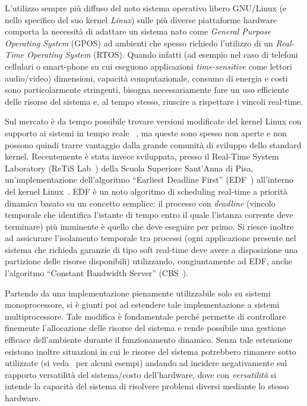 \documentclass[a4paper, 11pt, oneside]{article}
\begin{document}
L'utilizzo sempre più diffuso del noto sistema operativo libero GNU/Linux (e
nello specifico del suo kernel \emph{Linux}) sulle più diverse piattaforme
hardware comporta la necessità di adattare un sistema nato come \emph{General
Purpose Operating System} (GPOS) ad ambienti che spesso richiedo l'utilizzo
di un \emph{Real-Time Operating System} (RTOS). Quando infatti (ad esempio
nel caso di telefoni cellulari o smart-phone su cui eseguono applicazioni
\emph{time-sensitive} come lettori audio/video) dimensioni,
capacità computazionale, consumo di energia e costi sono particolarmente
stringenti, bisogna necessariamente fare un uso efficiente delle risorse del
sistema e, al tempo stesso, riuscire a rispettare i vincoli real-time.

Sul mercato è da tempo possibile trovare versioni modificate del kernel Linux
con supporto ai sistemi in tempo reale~\cite{windriver, timesys, montavista}
, ma queste sono spesso non aperte e non
possono quindi trarre vantaggio dalla grande comunità di sviluppo dello
standard kernel. Recentemente è stata invece sviluppata, presso il  Real-Time
System Laboratory (ReTiS Lab~\cite{RETIS}) della Scuola Superiore Sant'Anna di
Pisa, un'implementazione dell'algoritmo ``Earliest Deadline First''
(EDF~\cite{LiuL1973, stankovic98}) all'interno
del kernel Linux~\cite{SCHED_EDF09, SCHEDDEAD, scheddeadv2}. EDF è un noto
algoritmo di scheduling real-time a priorità
dinamica basato su un concetto semplice: il processo con \emph{deadline}
(vincolo temporale che identifica l'istante di tempo entro il quale l'istanza
corrente deve terminare) più imminente è quello che deve eseguire per primo.
Si riesce inoltre ad assicurare l'isolamento temporale tra processi (ogni
applicazione presente nel sistema che richieda garanzie di tipo soft real-time
deve avere a disposizione una partizione delle risorse disponibili) utilizzando,
congiuntamente ad EDF, anche l'algoritmo ``Constant Bandwidth Server''
(CBS~\cite{abeniButtazzo98, abeniButtazzo04}).

Partendo da una implementazione pienamente utilizzabile solo su sistemi
monoprocessore, si è giunti poi ad estendere tale implementazione a sistemi
multiprocessore. Tale modifica è fondamentale perché permette di controllare
finemente l'allocazione delle risorse del sistema e rende possibile una gestione 
efficace dell'ambiente durante il funzionamento dinamico. Senza tale estensione
esistono inoltre situazioni in cui le risorse del sistema potrebbero rimanere
sotto utilizzate (si veda~\cite{HOS} per alcuni esempi) andando ad incidere
negativamente sul rapporto
versatilità del sistema/costo dell'hardware, dove con \emph{versatilità} si
intende la capacità del sistema di risolvere problemi diversi mediante lo
stesso hardware.
\end{document}
